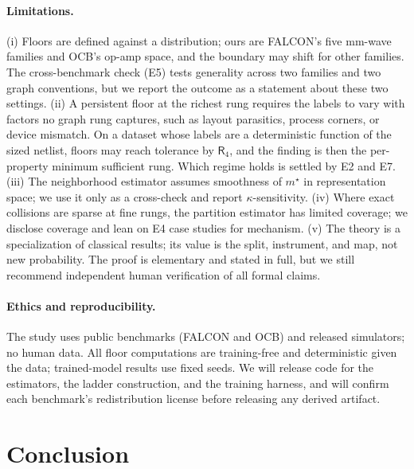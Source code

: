 \documentclass[10pt]{article}
\newcommand{\R}{\mathsf{R}}
\begin{document}
\paragraph{Limitations.}
(i) Floors are defined against a distribution; ours are FALCON's five mm-wave families and OCB's op-amp space, and the boundary may shift for other families. The cross-benchmark check (E5) tests generality across two families and two graph conventions, but we report the outcome as a statement about these two settings. (ii) A persistent floor at the richest rung requires the labels to vary with factors no graph rung captures, such as layout parasitics, process corners, or device mismatch. On a dataset whose labels are a deterministic function of the sized netlist, floors may reach tolerance by $\R_4$, and the finding is then the per-property minimum sufficient rung. Which regime holds is settled by E2 and E7. (iii) The neighborhood estimator assumes smoothness of $m^\star$ in representation space; we use it only as a cross-check and report $\kappa$-sensitivity. (iv) Where exact collisions are sparse at fine rungs, the partition estimator has limited coverage; we disclose coverage and lean on E4 case studies for mechanism. (v) The theory is a specialization of classical results; its value is the split, instrument, and map, not new probability. The proof is elementary and stated in full, but we still recommend independent human verification of all formal claims.

\paragraph{Ethics and reproducibility.}
The study uses public benchmarks (FALCON and OCB) and released simulators; no human data. All floor computations are training-free and deterministic given the data; trained-model results use fixed seeds. We will release code for the estimators, the ladder construction, and the training harness, and will confirm each benchmark's redistribution license before releasing any derived artifact.

\section{Conclusion}
\end{document}
